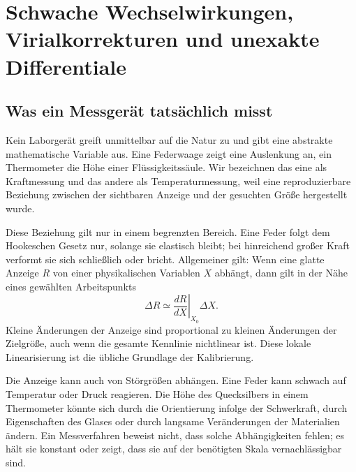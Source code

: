 \chapter{Schwache Wechselwirkungen, Virialkorrekturen und unexakte Differentiale}


\section{Was ein Messgerät tatsächlich misst}

Kein Laborgerät greift unmittelbar auf die Natur zu und gibt eine abstrakte mathematische Variable aus. Eine Federwaage zeigt eine Auslenkung an, ein Thermometer die Höhe einer Flüssigkeitssäule. Wir bezeichnen das eine als Kraftmessung und das andere als Temperaturmessung, weil eine reproduzierbare Beziehung zwischen der sichtbaren Anzeige und der gesuchten Größe hergestellt wurde.

Diese Beziehung gilt nur in einem begrenzten Bereich. Eine Feder folgt dem Hookeschen Gesetz nur, solange sie elastisch bleibt; bei hinreichend großer Kraft verformt sie sich schließlich oder bricht. Allgemeiner gilt: Wenn eine glatte Anzeige \(R\) von einer physikalischen Variablen \(X\) abhängt, dann gilt in der Nähe eines gewählten Arbeitspunkts
\begin{equation}
 \Delta R \simeq
 \left.\frac{dR}{dX}\right|_{X_0}\Delta X.
 \label{eq:sm6-local-linear-response}
\end{equation}
Kleine Änderungen der Anzeige sind proportional zu kleinen Änderungen der Zielgröße, auch wenn die gesamte Kennlinie nichtlinear ist. Diese lokale Linearisierung ist die übliche Grundlage der Kalibrierung.

Die Anzeige kann auch von Störgrößen abhängen. Eine Feder kann schwach auf Temperatur oder Druck reagieren. Die Höhe des Quecksilbers in einem Thermometer könnte sich durch die Orientierung infolge der Schwerkraft, durch Eigenschaften des Glases oder durch langsame Veränderungen der Materialien ändern. Ein Messverfahren beweist nicht, dass solche Abhängigkeiten fehlen; es hält sie konstant oder zeigt, dass sie auf der benötigten Skala vernachlässigbar sind.

